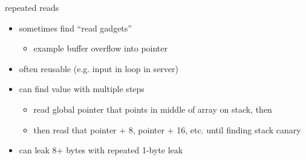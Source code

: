 \begin{frame}[fragile]{repeated reads}
\begin{itemize}
\item sometimes find ``read gadgets''
    \begin{itemize}
    \item example buffer overflow into pointer
    \end{itemize}
\item often reusable (e.g. input in loop in server)
\item can find value with multiple steps
    \begin{itemize}
    \item read global pointer that points in middle of array on stack, then
    \item then read that pointer + 8, pointer + 16, etc. until finding stack canary
    \end{itemize}
\item can leak 8+ bytes with repeated 1-byte leak
\end{itemize}
\end{frame}

